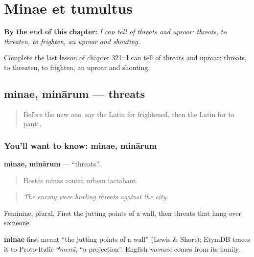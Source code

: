 
\chapter{Minae et tumultus}
\label{ch:la-minae-et-tumultus}

\begin{chapteropening}
\textbf{By the end of this chapter:} \emph{I can tell of threats and uproar: threats, to threaten, to frighten, an uproar and shouting.}

Complete the last lesson of chapter 321: I can tell of threats and uproar: threats, to threaten, to frighten, an uproar and shouting.
\end{chapteropening}

\section[minae, minārum]{minae, minārum — threats}

\label{lesson:LA-C321-minae}



\begin{quote}
Before the new one: say the Latin for frightened, then the Latin for to panic.
\end{quote}

\subsection*{You'll want to know: minae, minārum}
\textbf{minae, minārum} — \textquotedblleft{}threats\textquotedblright{}.

\begin{quote}
Hostēs minās contrā urbem iactābant.
\end{quote}

\begin{quote}
\emph{The enemy were hurling threats against the city.}
\end{quote}

Feminine, plural. First the jutting points of a wall, then threats that hang over someone.

\begin{cousinweb}
\textbf{minae} first meant \textquotedblleft{}the jutting points of a wall\textquotedblright{} (Lewis \& Short); EtymDB traces it to Proto-Italic \emph{*menā}, \textquotedblleft{}a projection\textquotedblright{}. English \emph{menace} comes from its family.
\end{cousinweb}

